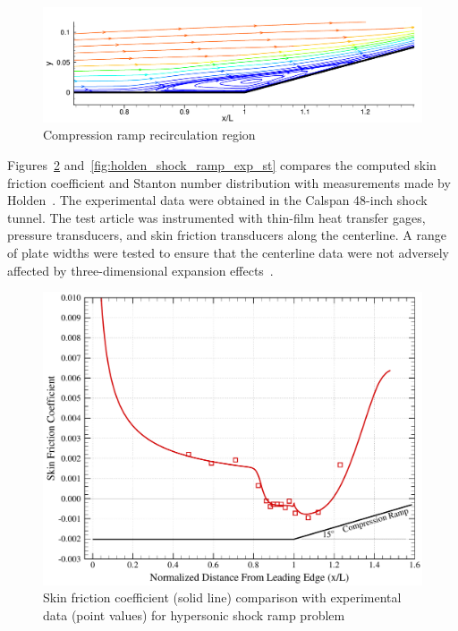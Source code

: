 \begin{figure}[hbtp]
  \begin{center}
    \includegraphics[width=\textwidth]{figures/holden_ramp/recirculation}
    \caption{Compression ramp recirculation region\label{fig:holden_shock_ramp_recirculation}}
  \end{center}
\end{figure}

Figures~\ref{fig:holden_shock_ramp_exp_cf} and~\ref{fig:holden_shock_ramp_exp_st} compares the computed skin friction coefficient and Stanton number distribution with measurements made by Holden~\cite{holden_laminar_interaction}.  The experimental data were obtained in the Calspan 48-inch shock tunnel.  The test article was instrumented with thin-film heat transfer gages, pressure transducers, and skin friction transducers along the centerline.  A range of plate widths were tested to ensure that the centerline data were not adversely affected by three-dimensional expansion effects~\cite{holden_laminar_interaction}.

\begin{figure}[hbtp]
  \begin{center}
    \includegraphics[width=\textwidth]{figures/holden_ramp/skin_friction}
    \caption[Skin friction coefficient comparison with experimental data for hypersonic shock ramp problem]{Skin friction coefficient (solid line) comparison with experimental data (point values) for hypersonic shock ramp problem\label{fig:holden_shock_ramp_exp_cf}}
  \end{center}
\end{figure}


